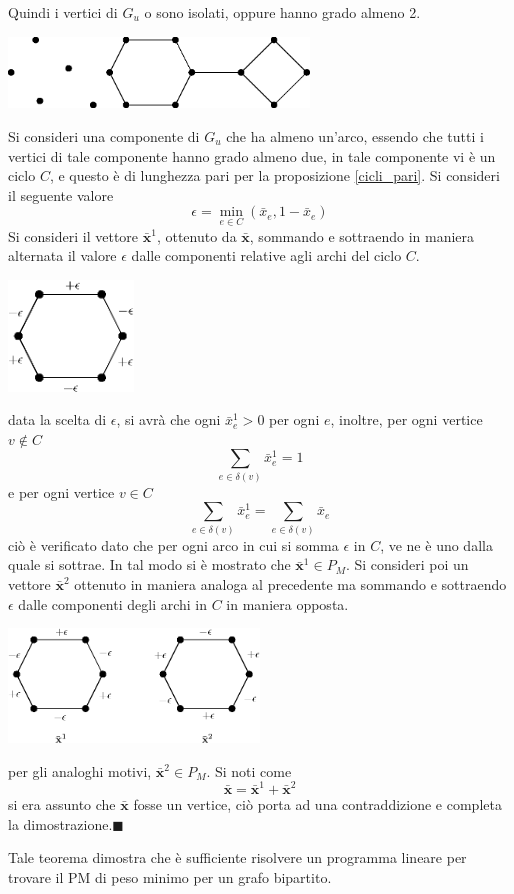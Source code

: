 \documentclass[10pt, letterpaper]{report}
\newcommand{\x}{{\mathbf{x}}}
\begin{document}
\noindent
Quindi i vertici di $G_u$ o sono isolati, oppure hanno grado almeno 2.\begin{center}
    \includegraphics[width=0.6\textwidth ]{images/grafo_deg_no_1.eps}
\end{center}
Si consideri una componente di $G_u$ che ha almeno un'arco, essendo che tutti i vertici di tale componente hanno grado almeno due, in tale componente vi è un ciclo $C$, e questo è di lunghezza pari per la proposizione \ref{cicli_pari}. Si consideri il seguente valore 
$$\epsilon = \min_{e\in C}(\bar x_e,1-\bar x_e) $$
Si consideri il vettore $\bar\x^1$, ottenuto da $\bar\x$, sommando e sottraendo in maniera alternata il valore $\epsilon$ dalle componenti relative agli archi del ciclo $C$.\begin{center}
    \includegraphics[width=0.25\textwidth ]{images/pm_epsilon.eps}
\end{center}
data la scelta di $\epsilon$, si avrà che ogni $\bar x_e^1>0$ per ogni $e$, inoltre, per ogni vertice $v\notin C$
$$ \sum_{e\in\delta(v)}\bar x_e^1=1$$
e per ogni vertice $v\in C$
$$ \sum_{e\in\delta(v)}\bar x_e^1= \sum_{e\in\delta(v)}\bar x_e$$
ciò è verificato dato che per ogni arco in cui si somma $\epsilon$ in $C$, ve ne è uno dalla quale si sottrae. In tal modo si è mostrato che $\bar \x^1\in P_M$. Si consideri poi un vettore $\bar \x^2$ ottenuto in maniera analoga al precedente ma sommando e sottraendo $\epsilon$ dalle componenti degli archi in $C$ in maniera opposta.\begin{center}
    \includegraphics[width=0.5\textwidth ]{images/pm_epsilon2.eps}
\end{center}
per gli analoghi motivi, $\bar \x^2\in P_M$. Si noti come 
$$\bar \x = \bar \x^1+\bar \x^2 $$
si era assunto che $\bar \x$ fosse un vertice, ciò porta ad una contraddizione e completa la dimostrazione.\hfill$\blacksquare$\bigskip 

\noindent
Tale teorema dimostra che è sufficiente risolvere un programma lineare per trovare il PM di peso minimo per un grafo bipartito.
\end{document}

